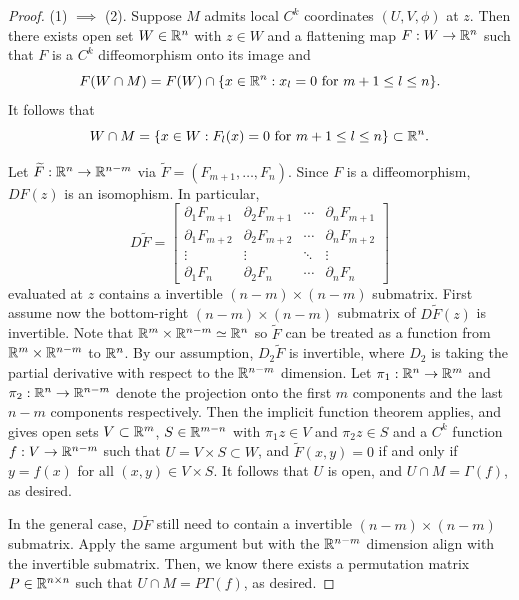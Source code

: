 \documentclass[a4paper]{article}
\begin{document}
\begin{proof}
  (1) $\implies$ (2). Suppose $M$ admits local
  $C^k$ coordinates $(U, V, \phi)$ at $z$. Then there exists
  open set $W \in \mathbb{R}^n$ with $z \in W$ and a flattening map
  $F : W \to \mathbb{R}^n$ such that $F$ is a $C^k$ diffeomorphism
  onto its image and
  \[
    F(W \cap M) = F(W) \cap \{x \in \mathbb{R}^n : \text{$x_l = 0$
    for $m + 1 \leq l \leq n$}\}.
  \]
  It follows that
  \[
    W \cap M = \{x \in W: \text{$F_l(x) = 0$ for
  $m + 1 \leq l \leq n$}\} \subset \mathbb{R}^n.
  \]

  Let $\widetilde{F} : \mathbb{R}^n \to \mathbb{R}^{n - m}$ via $\tilde{F} = (F_{m+1}, \dots,
  F_n)$. Since $F$ is a diffeomorphism, $DF(z)$ is an isomophism. In
  particular,
  \[
    D \tilde{F} =
    \begin{bmatrix}
      \partial_1 F_{m+1} & \partial_2 F_{m+1} & \cdots & \partial_n F_{m+1} \\
      \partial_1 F_{m+2} & \partial_2 F_{m+2} & \cdots & \partial_n F_{m+2} \\
      \vdots             & \vdots             & \ddots & \vdots             \\
      \partial_1 F_n     & \partial_2 F_n     & \cdots & \partial_n F_n
    \end{bmatrix}
  \]
  evaluated at $z$ contains a invertible $(n - m) \times (n - m)$
  submatrix. First assume now the bottom-right $(n - m) \times (n - m)$
  submatrix of $D \tilde{F} (z)$ is invertible. Note that $\mathbb{R}^m \times
  \mathbb{R}^{n - m} \simeq \mathbb{R}^n$ so $\tilde{F}$ can be treated as a function from
  $\mathbb{R}^m \times \mathbb{R}^{n - m}$ to $\mathbb{R}^n$. By our assumption, $D_2 \tilde{F}$
  is invertible, where $D_2$ is taking the partial derivative with respect
  to the $\mathbb{R}^{n - m}$ dimension. Let $\pi_1 : \mathbb{R}^n \to \mathbb{R}^m$ and $\pi_2 :
  \mathbb{R}^n \to \mathbb{R}^{n-m}$ denote the projection onto the first $m$ components
  and the last $n - m$ components respectively. Then the implicit function
  theorem applies, and gives open sets $V \subset \mathbb{R}^m$, $S \in \mathbb{R}^{m -
  n}$ with $\pi_1 z \in V$ and $\pi_2 z \in S$ and a $C^k$ function $f : V
  \to \mathbb{R}^{n - m}$ such that $U = V \times S \subset W$, and $\tilde{F}(x,
  y) = 0$ if and only if $y = f(x)$ for all $(x, y) \in V \times S$. It
  follows that $U$ is open, and $U \cap M = \Gamma(f)$, as desired.

  In the general case, $D \tilde{F}$ still need to contain a invertible
  $(n - m) \times (n - m)$ submatrix. Apply the same argument but with the
  $\mathbb{R}^{n - m}$ dimension align with the invertible submatrix. Then, we
  know there exists a permutation matrix $P \in \mathbb{R}^{n \times n}$ such that
  $U \cap M = P \Gamma(f)$, as desired.


\end{proof}
\end{document}

